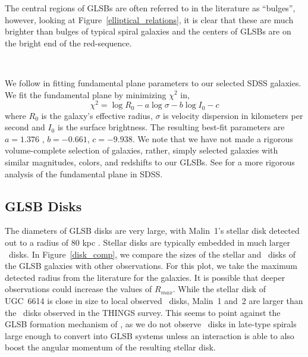 \documentclass[12pt,preprint]{aastex}
\newcommand\HI{\ion{H}{1}}
\begin{document}
The central regions of GLSBs are often referred to in the literature as ``bulges'', however, looking at Figure~\ref{elliptical_relations}, it is clear that these are much brighter than bulges of typical spiral galaxies and the centers of GLSBs are on the bright end of the red-sequence.


\begin{figure*}
\\
\caption{
Top Left:  The color-magnitude diagram for 141,000 galaxies of similar redshift and magnitude as Malin~2 and UGC~6614.
Top Right:  The Faber-Jackson relation for 45,700 SDSS galaxies, along with a best-fit line.
Left:  The $r$-band fundamental plane from SDSS along with our GLSB galaxies and best-fit line.
Bottom Right:  The relation between central velocity dispersion and the Mg2 absorption feature.
 From the point of view of the SDSS data reduction pipeline, GLSB galaxies appear as relatively red elliptical galaxies on the red-sequence.
\label{elliptical_relations}}
\end{figure*}

We follow \citet{Bernardi03,Bernardi03b} in fitting fundamental plane parameters to our selected SDSS galaxies.
We fit the fundamental plane by minimizing $\chi^2$ in, 
\begin{equation}
\chi^2 = \log R_0 - a \log \sigma - b \log I_0 - c
\end{equation}
where $R_0$ is the galaxy's effective radius, $\sigma$ is velocity dispersion in kilometers per second and $I_0$ is the surface brightness.
The resulting best-fit parameters are  $a =1.376$ , $b = -0.661$, $c = -9.938$.
We note that we have not made a rigorous volume-complete selection of galaxies, rather, simply selected galaxies with similar magnitudes, colors, and redshifts to our GLSBs.
 See \citet{Saulder13} for a more rigorous analysis of the fundamental plane in SDSS. 

\subsection{GLSB Disks}\label{sec:disks}


The diameters of GLSB disks are very large, with Malin~1's stellar disk detected out to a radius of 80 kpc \citep{Galaz15}.
Stellar disks are typically embedded in much larger \HI\ disks.
In Figure~\ref{disk_comp}, we compare the sizes of the stellar and \HI\ disks of the GLSB galaxies with other observations.
For this plot, we take the maximum detected radius from the literature for the galaxies.
It is possible that deeper observations could increase the values of $R_{max}$.
While the stellar disk of UGC~6614 is close in size to local observed \HI\ disks, Malin~1 and~2 are larger than the \HI\ disks observed in the THINGS survey.
This seems to point against the GLSB formation mechanism of \citet{Mapelli08}, as we do not observe \HI\ disks in late-type spirals large enough to convert into GLSB systems unless an interaction is able to also boost the angular momentum of the resulting stellar disk.
\end{document}

